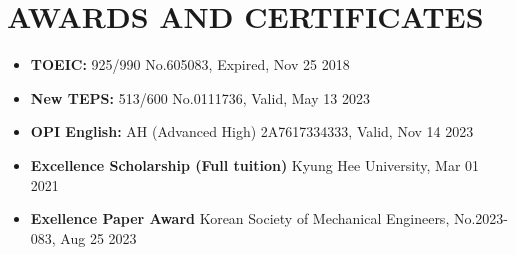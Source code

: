 \documentclass[a4paper,10pt]{extarticle}
\begin{document}
\section*{AWARDS AND CERTIFICATES}
\begin{itemize}
    \item \textbf{TOEIC:} 925/990 \hfill No.605083, Expired, Nov 25 2018
    \item \textbf{New TEPS:} 513/600 \hfill No.0111736, Valid, May 13 2023

    \item \textbf{OPI English:} AH (Advanced High) \hfill 2A7617334333, Valid, Nov 14 2023
    \item \textbf{Excellence Scholarship (Full tuition)} \hfill Kyung Hee University, Mar 01 2021
    \item \textbf{Exellence Paper Award} \hfill Korean Society of Mechanical Engineers, No.2023-083, Aug 25 2023
\end{itemize}


\end{document}
